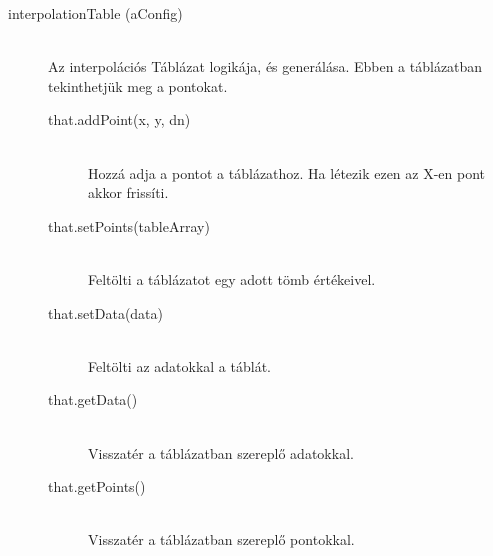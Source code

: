 \begin{description}
		\item[interpolationTable (aConfig)]
			\hfill \\ 
				Az interpolációs Táblázat logikája, és generálása. Ebben a táblázatban tekinthetjük meg a pontokat.
			\begin{description}
			\item[that.addPoint(x, y, dn)] 
			\hfill \\ Hozzá adja a pontot a táblázathoz. Ha létezik ezen az X-en pont akkor frissíti.
			\item[that.setPoints(tableArray)] 
			\hfill \\ Feltölti a táblázatot egy adott tömb értékeivel.
			\item[that.setData(data)] 
			\hfill \\ Feltölti az adatokkal a táblát.
			\item[that.getData()] 
			\hfill \\ Visszatér a táblázatban szereplő adatokkal.
			\item[that.getPoints()] 
			\hfill \\ Visszatér a táblázatban szereplő pontokkal.
			\end{description}
	\end{description}